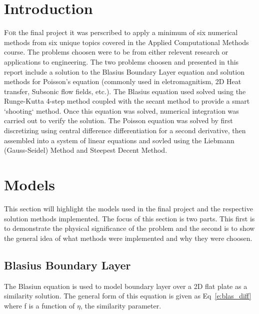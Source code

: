 \documentclass[]{aiaa-tc}%
\begin{document}
\FloatBarrier\section{Introduction}
\lettrine[nindent=0pt]{F}{or} the final project it was perscribed to apply a minimum of six numerical methods
from six unique topics covered in the Applied Computational Methods course. The
problems choosen were to be from either relevent research or applications to engineering.
The two problems choosen and presented in this report include a solution to the Blasius
Boundary Layer equation and solution methods for Poisson's equation
(commonly used in eletromagnitism, 2D Heat transfer, Subsonic flow fields, etc.). The
Blasius equation used solved using the Runge-Kutta 4-step method coupled with the
secant method to provide a smart `shooting` method. Once this equation was solved,
numerical integration was carried out to verify the solution. The Poisson equation was
solved by first discretizing using central difference differentiation for a second
derivative, then assembled into a system of linear equations and sovled using the
Liebmann (Gauss-Seidel) Method and Steepest Decent Method.


\FloatBarrier\section{Models}
This section will highlight the models used in the final project and the respective
solution methods implemented. The focus of this section is two parts. This first
is to demonstrate the physical significance of the problem and the second is to
show the general idea of what methods were implemented and why they were choosen.

\FloatBarrier\subsection{Blasius Boundary Layer}
The Blasiun equation is used to model boundary layer over a 2D flat plate as a
similarity solution. The general form of this equation is given as Eq~\ref{e:blas_diff}
where f is a function of $\eta$, the similarity parameter.
\end{document}
